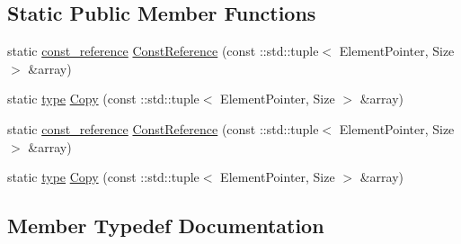 \subsection*{Static Public Member Functions}
\begin{DoxyCompactItemize}
\item 
static \mbox{\hyperlink{classtesting_1_1internal_1_1_stl_container_view_3_01_1_1std_1_1tuple_3_01_element_pointer_00_01_size_01_4_01_4_a0c2c9116c784cce6554d4aac9910482b}{const\+\_\+reference}} \mbox{\hyperlink{classtesting_1_1internal_1_1_stl_container_view_3_01_1_1std_1_1tuple_3_01_element_pointer_00_01_size_01_4_01_4_af58cbd5be79a8884b3425d39465f4bce}{Const\+Reference}} (const \+::std\+::tuple$<$ Element\+Pointer, Size $>$ \&array)
\item 
static \mbox{\hyperlink{classtesting_1_1internal_1_1_stl_container_view_3_01_1_1std_1_1tuple_3_01_element_pointer_00_01_size_01_4_01_4_aaa0289cd65ef99ea632d2fb0ad5480eb}{type}} \mbox{\hyperlink{classtesting_1_1internal_1_1_stl_container_view_3_01_1_1std_1_1tuple_3_01_element_pointer_00_01_size_01_4_01_4_acd52f4f1bbc1fe4341e8f60e6d5f0190}{Copy}} (const \+::std\+::tuple$<$ Element\+Pointer, Size $>$ \&array)
\item 
static \mbox{\hyperlink{classtesting_1_1internal_1_1_stl_container_view_3_01_1_1std_1_1tuple_3_01_element_pointer_00_01_size_01_4_01_4_a0c2c9116c784cce6554d4aac9910482b}{const\+\_\+reference}} \mbox{\hyperlink{classtesting_1_1internal_1_1_stl_container_view_3_01_1_1std_1_1tuple_3_01_element_pointer_00_01_size_01_4_01_4_af58cbd5be79a8884b3425d39465f4bce}{Const\+Reference}} (const \+::std\+::tuple$<$ Element\+Pointer, Size $>$ \&array)
\item 
static \mbox{\hyperlink{classtesting_1_1internal_1_1_stl_container_view_3_01_1_1std_1_1tuple_3_01_element_pointer_00_01_size_01_4_01_4_aaa0289cd65ef99ea632d2fb0ad5480eb}{type}} \mbox{\hyperlink{classtesting_1_1internal_1_1_stl_container_view_3_01_1_1std_1_1tuple_3_01_element_pointer_00_01_size_01_4_01_4_acd52f4f1bbc1fe4341e8f60e6d5f0190}{Copy}} (const \+::std\+::tuple$<$ Element\+Pointer, Size $>$ \&array)
\end{DoxyCompactItemize}


\subsection{Member Typedef Documentation}
\mbox{\label{classtesting_1_1internal_1_1_stl_container_view_3_01_1_1std_1_1tuple_3_01_element_pointer_00_01_size_01_4_01_4_a0c2c9116c784cce6554d4aac9910482b}} 
